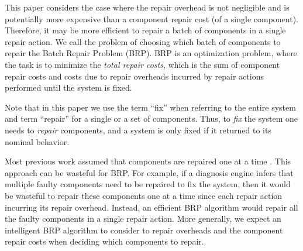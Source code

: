 \documentclass[review]{elsarticle}
\begin{document}
This paper considers the case where the repair overhead is not negligible and is potentially more expensive than a component repair cost (of a single component). Therefore, it may be more efficient to repair a batch of components in a single repair action. We call the problem of choosing which batch of components to repair the Batch Repair Problem (BRP). BRP is an optimization problem, where the task is to minimize the {\em total repair costs}, which is the sum of component repair costs and costs due to repair overheads incurred by repair actions performed until the system is fixed.

Note that in this paper we use the term  ``fix'' when referring to the entire system and term ``repair'' for a single or a set of components.  Thus, 
to {\em fix} the system one needs to {\em repair} components, and a system is only fixed if it returned to its nominal behavior.



Most previous work assumed that components are repaired one at a time \cite{heckerman1995decision,friedrich1992choosing,Nyberg12,Torta14}. This approach can be wasteful for BRP. For example, if a diagnosis engine infers that multiple faulty components need to be repaired to fix the system, then it would be wasteful to repair these components one at a time since each repair action incurring its repair overhead. Instead, an efficient BRP algorithm would repair all the faulty components in a single repair action. More generally, we expect an intelligent BRP algorithm to consider to repair overheads and the component repair costs when deciding which components to repair. 
\end{document}
